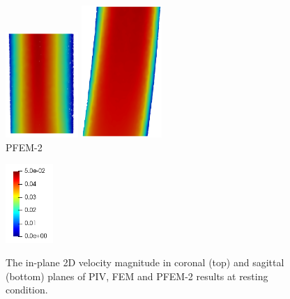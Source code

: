 \begin{figure}
\begin{minipage}[c][10cm][c]{0.25\textwidth}
\end{minipage}
\begin{minipage}[c][10cm][c]{0.25\textwidth}
\centering
\vspace*{\fill}
\includegraphics[height=4cm]{imgs/vena_cava/PFEM_coronal_rest.png}
\includegraphics[height=5cm]{imgs/vena_cava/PFEM_sagittal_rest.png}
\\PFEM-2
\end{minipage}
\begin{minipage}[c][10cm][t]{0.1\textwidth}
\vspace*{\fill}
\centering
\includegraphics[height=3cm]{imgs/vena_cava/colormap_rest.png}
\\
\end{minipage}
\caption{The in-plane 2D velocity magnitude in coronal (top) and sagittal (bottom) planes of PIV, FEM and PFEM-2 results at resting condition.}
\label{fig:rest}
\end{figure}


